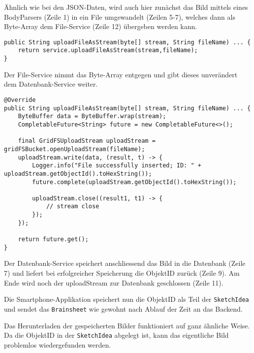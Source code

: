 Ähnlich wie bei den JSON-Daten, wird auch hier zunächst das Bild mittels eines BodyParsers (Zeile 1) in ein File umgewandelt (Zeilen 5-7), welches dann als Byte-Array dem File-Service (Zeile 12) übergeben werden kann. 

\begin{lstlisting}[caption={Upload File im File Service}, label=uploadFileService]
public String uploadFileAsStream(byte[] stream, String fileName) ... {
    return service.uploadFileAsStream(stream,fileName);
}
\end{lstlisting}

Der File-Service nimmt das Byte-Array entgegen und gibt dieses unverändert dem Datenbank-Service weiter.

\begin{lstlisting}[caption={Upload File im DB Service}, label=uploadFileDBService]
@Override
public String uploadFileAsStream(byte[] stream, String fileName) ... {
    ByteBuffer data = ByteBuffer.wrap(stream);
    CompletableFuture<String> future = new CompletableFuture<>();

    final GridFSUploadStream uploadStream = gridFSBucket.openUploadStream(fileName);
    uploadStream.write(data, (result, t) -> {
        Logger.info("File successfully inserted; ID: " + uploadStream.getObjectId().toHexString());
        future.complete(uploadStream.getObjectId().toHexString());

        uploadStream.close((result1, t1) -> {
            // stream close
        });
    });

    return future.get();
}
\end{lstlisting}

Der Datenbank-Service speichert anschliessend das Bild in die Datenbank (Zeile 7) und liefert bei erfolgreicher Speicherung die ObjektID zurück (Zeile 9). Am Ende wird noch der uploadStream zur Datenbank geschlossen (Zeile 11).

Die Smartphone-Applikation speichert nun die ObjektID als Teil der \texttt{SketchIdea} und sendet das \texttt{Brainsheet} wie gewohnt nach Ablauf der Zeit an das Backend.

Das Herunterladen der gespeicherten Bilder funktioniert auf ganz ähnliche Weise. Da die ObjektID in der \texttt{SketchIdea} abgelegt ist, kann das eigentliche Bild problemlos wiedergefunden werden.

